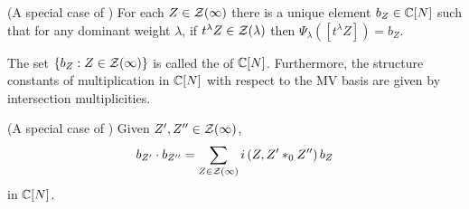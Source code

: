\documentclass[draft]{article} %
\begin{document}
\begin{theorem}
    (A special case of \cite[Proposition~6.1]{baumann2019mirkovic})
    For each $Z\in\mathcal Z(\infty)$ there is a unique element $b_Z\in\mathbb C[N]$ such that for any dominant weight $\lambda$, if $t^\lambda Z\in\mathcal Z(\lambda)$ then $\Psi_\lambda([t^\lambda Z]) = b_Z$.
\end{theorem}
The set $ \{b_Z : Z \in \mathcal Z(\infty) \}$ is called the  of $ \mathbb C[N]$.
% 
Furthermore, the structure constants of multiplication in $\mathbb C[N]$ with respect to the MV basis are given by intersection multiplicities. 
% 
\begin{theorem}
    (A special case of \cite[Theorem~7.11]{baumann2019mirkovic}) Given $Z',Z''\in\mathcal Z(\infty)$, 
\begin{equation}
    \label{eq:btimesb}
b_{Z'}\cdot b_{Z''} = \sum_{Z\in\mathcal Z(\infty)} i\left(Z, Z' \ast_{0} Z''\right) b_Z 
\end{equation}
in $\mathbb C[N]$. 
% 
\end{theorem}
% 
% 
\end{document}
